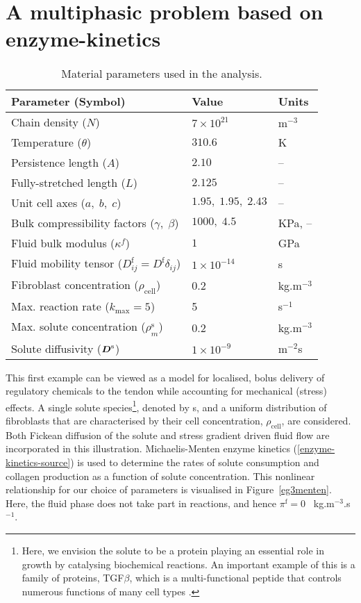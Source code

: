 \section{A multiphasic problem based on enzyme-kinetics}
\label{enzyme-kinetics-example}

\begin{table}
\centering
\begin{tabular}{|l|l|l|}
\hline Parameter (Symbol) & Value & Units\\ \hline \hline Chain
density ($N$) & $7\times 10^{21}$ & $\mathrm{m}^{-3}$\\ Temperature
($\theta$) & $310.6$ & K\\ Persistence length ($A$) & $2.10$ &
--\\ Fully-stretched length ($L$) & $2.125$ & --\\ Unit cell axes
($a,\;b,\;c$) & $1.95,\;1.95,\;2.43$ & --\\ Bulk compressibility
factors ($\gamma,\;\beta$) & $1000,\; 4.5$ & KPa, --\\ Fluid bulk
modulus ($\kappa^f$) & $1$ & GPa\\ Fluid mobility tensor
($D^\mathrm{f}_{ij} = D^\mathrm{f}\delta_{ij}$) & $1\times 10^{-14}$
&s\\ Fibroblast concentration ($\rho_{\mathrm{cell}}$) & 0.2 &
kg.m$^{-3}$\\ Max. reaction rate ($k_{\mathrm{max}} = 5$) & 5 &
s$^{-1}$\\ Max. solute concentration ($\rho^{\mathrm{s}}_m$) & 0.2 &
kg.m$^{-3}$\\ Solute diffusivity ($\mbox{\boldmath$ D$}^\mathrm{s}$) & $1\times
10^{-9}$ & m$^{-2}$s\\ \hline
\end{tabular}
\caption{Material parameters used in the analysis.}
\label{parameters}
\end{table}

This first example can be viewed as a model for localised, bolus
delivery of regulatory chemicals to the tendon while accounting for
mechanical (stress) effects. A single solute species\footnote{Here, we
  envision the solute to be a protein playing an essential role in
  growth by catalysing biochemical reactions. An important example of
  this is a family of proteins, TGF$\beta$, which is a
  multi-functional peptide that controls numerous functions of many
  cell types \citep{Alberts:02}.}, denoted by s, and a uniform
distribution of fibroblasts that are characterised by their cell
concentration, $\rho_{\mathrm{cell}}$, are considered. Both Fickean
diffusion of the solute and stress gradient driven fluid flow are
incorporated in this illustration. Michaelis-Menten enzyme kinetics
(\ref{enzyme-kinetics-source}) is used to determine the rates of
solute consumption and collagen production as a function of solute
concentration. This nonlinear relationship for our choice of
parameters is visualised in Figure~\ref{eg3menten}. Here, the fluid
phase does not take part in reactions, and hence $\pi^\mathrm{f}=0$~%
kg.m$^{-3}$.s$^{-1}$.

